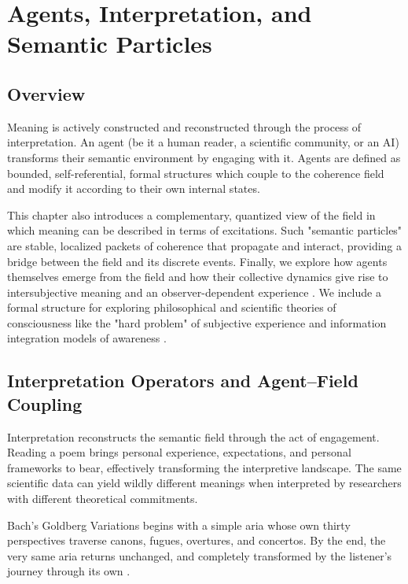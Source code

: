 \chapter{Agents, Interpretation, and Semantic Particles}

\section{Overview}

Meaning is actively constructed and reconstructed through the process of interpretation. An agent (be it a human reader, a scientific community, or an AI) transforms their semantic environment by engaging with it. Agents are defined as bounded, self-referential, formal structures which couple to the coherence field and modify it according to their own internal states.

This chapter also introduces a complementary, quantized view of the field in which meaning can be described in terms of excitations. Such "semantic particles" are stable, localized packets of coherence that propagate and interact, providing a bridge between the field and its discrete events. Finally, we explore how agents themselves emerge from the field and how their collective dynamics give rise to intersubjective meaning and an observer-dependent experience \autocite{Wheeler1990, vonNeumann1955}. We include a formal structure for exploring philosophical and scientific theories of consciousness like the "hard problem" of subjective experience and information integration models of awareness \autocite{Chalmers1996, Tononi2004}.

\section{Interpretation Operators and Agent–Field Coupling}

Interpretation reconstructs the semantic field through the act of engagement. Reading a poem brings personal experience, expectations, and personal frameworks to bear, effectively transforming the interpretive landscape. The same scientific data can yield wildly different meanings when interpreted by researchers with different theoretical commitments.

Bach's Goldberg Variations begins with a simple aria whose own thirty perspectives traverse canons, fugues, overtures, and concertos. By the end, the very same aria returns unchanged, and completely transformed by the listener's journey through its own \autocite{Bach1741}.

